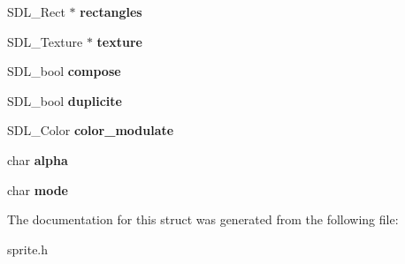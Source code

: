 \begin{DoxyCompactItemize}
\item 
\hypertarget{structERPG__Sprite_a359b0e0240ba475a21e12f5bcddbf927}{S\-D\-L\-\_\-\-Rect $\ast$ {\bfseries rectangles}}\label{structERPG__Sprite_a359b0e0240ba475a21e12f5bcddbf927}

\item 
\hypertarget{structERPG__Sprite_ad235f1a8905ac1cbf419dc06a83a8dfb}{S\-D\-L\-\_\-\-Texture $\ast$ {\bfseries texture}}\label{structERPG__Sprite_ad235f1a8905ac1cbf419dc06a83a8dfb}

\item 
\hypertarget{structERPG__Sprite_a8a6d86b7da6ee2c92c242f85433b9b26}{S\-D\-L\-\_\-bool {\bfseries compose}}\label{structERPG__Sprite_a8a6d86b7da6ee2c92c242f85433b9b26}

\item 
\hypertarget{structERPG__Sprite_a429e46df763a750f7befdf3cb4356558}{S\-D\-L\-\_\-bool {\bfseries duplicite}}\label{structERPG__Sprite_a429e46df763a750f7befdf3cb4356558}

\item 
\hypertarget{structERPG__Sprite_a28c51ec7a91a8a30937d231d0a4eb707}{S\-D\-L\-\_\-\-Color {\bfseries color\-\_\-modulate}}\label{structERPG__Sprite_a28c51ec7a91a8a30937d231d0a4eb707}

\item 
\hypertarget{structERPG__Sprite_a78431810d9c0a4f50791172c70c5ec35}{char {\bfseries alpha}}\label{structERPG__Sprite_a78431810d9c0a4f50791172c70c5ec35}

\item 
\hypertarget{structERPG__Sprite_a4817f5f657099612d2bc02a013835d15}{char {\bfseries mode}}\label{structERPG__Sprite_a4817f5f657099612d2bc02a013835d15}

\end{DoxyCompactItemize}


The documentation for this struct was generated from the following file\-:\begin{DoxyCompactItemize}
\item 
sprite.\-h\end{DoxyCompactItemize}
